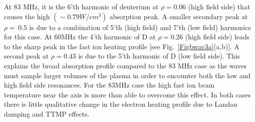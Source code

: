  At 83 MHz, it is the 6'th harmonic of
 deuterium at $\rho =0.06$ (high field side) that causes the high $(\sim 0.79
 W/cm^3)$ absorption peak. A smaller  secondary peak at $\rho = ~0.5$
 is due to a combination of 5'th (high field) and 7'th (low field)
 harmonics for this case.  At 60MHz the 4'th harmonic of D at $\rho =
 0.26$ (high field side) leads to the sharp peak in the fast ion
 heating profile [see Fig.~\ref{Figbwav3a}(a,b)]. A second peak at $\rho =
 0.43$ is due to the 5'th harmonic of D (low field side).  This
 explains the broad absorption profile compared to the 83 MHz case as
 the waves must sample larger volumes of the plasma in order to
 encounter both the low and high field side resonances. For the 83MHz
 case the high fast ion beam temperature near the axis is
 more than able to overcome this effect. In both cases there
 is little qualitative change in the electron heating profile due to
 Landau damping and TTMP effects. 
 
